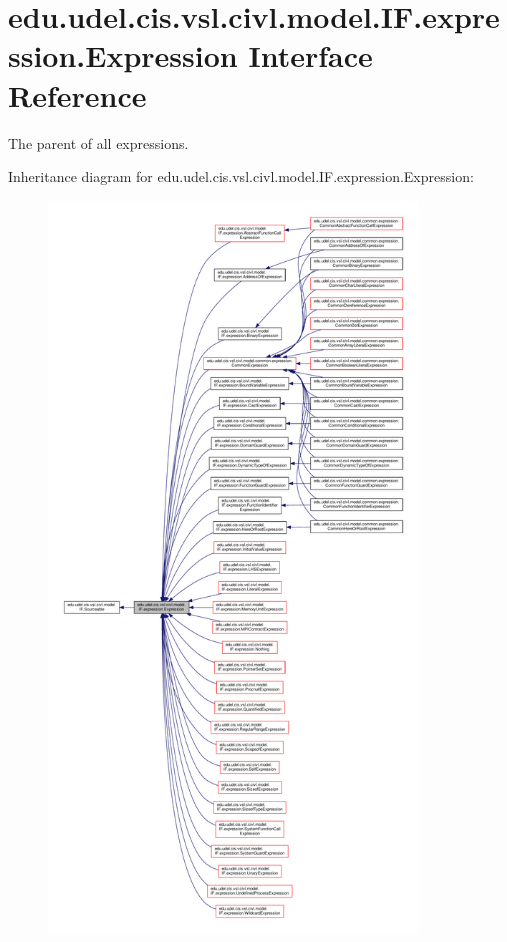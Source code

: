 \hypertarget{interfaceedu_1_1udel_1_1cis_1_1vsl_1_1civl_1_1model_1_1IF_1_1expression_1_1Expression}{}\section{edu.\+udel.\+cis.\+vsl.\+civl.\+model.\+I\+F.\+expression.\+Expression Interface Reference}
\label{interfaceedu_1_1udel_1_1cis_1_1vsl_1_1civl_1_1model_1_1IF_1_1expression_1_1Expression}


The parent of all expressions.  




Inheritance diagram for edu.\+udel.\+cis.\+vsl.\+civl.\+model.\+I\+F.\+expression.\+Expression\+:
\nopagebreak
\begin{figure}[H]
\begin{center}
\leavevmode
\includegraphics[height=550pt]{interfaceedu_1_1udel_1_1cis_1_1vsl_1_1civl_1_1model_1_1IF_1_1expression_1_1Expression__inherit__graph}
\end{center}
\end{figure}


